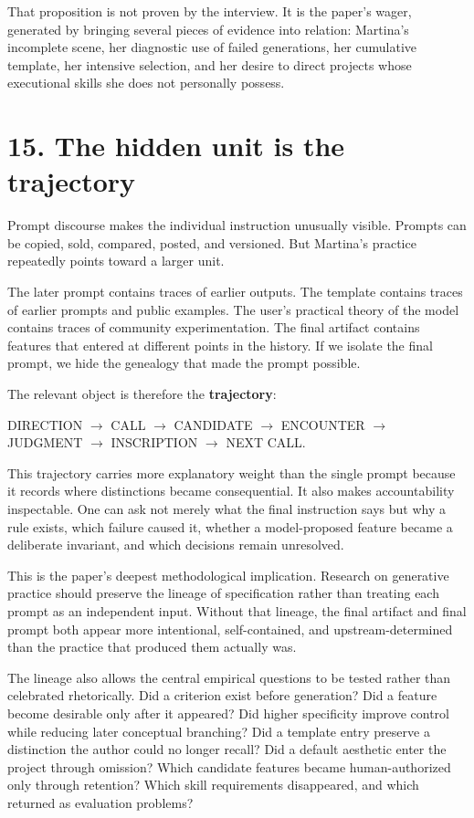\documentclass[
  11pt,
  letterpaper,
]{article}
\begin{document}
That proposition is not proven by the interview. It is the paper's
wager, generated by bringing several pieces of evidence into relation:
Martina's incomplete scene, her diagnostic use of failed generations,
her cumulative template, her intensive selection, and her desire to
direct projects whose executional skills she does not personally
possess.

\section{15. The hidden unit is the
trajectory}\label{the-hidden-unit-is-the-trajectory}

Prompt discourse makes the individual instruction unusually visible.
Prompts can be copied, sold, compared, posted, and versioned. But
Martina's practice repeatedly points toward a larger unit.

The later prompt contains traces of earlier outputs. The template
contains traces of earlier prompts and public examples. The user's
practical theory of the model contains traces of community
experimentation. The final artifact contains features that entered at
different points in the history. If we isolate the final prompt, we hide
the genealogy that made the prompt possible.

The relevant object is therefore the \textbf{trajectory}:

\begin{center}
DIRECTION $\rightarrow$ CALL $\rightarrow$ CANDIDATE $\rightarrow$ ENCOUNTER $\rightarrow$ JUDGMENT $\rightarrow$ INSCRIPTION $\rightarrow$ NEXT CALL.
\end{center}

This trajectory carries more explanatory weight than the single prompt
because it records where distinctions became consequential. It also
makes accountability inspectable. One can ask not merely what the final
instruction says but why a rule exists, which failure caused it, whether
a model-proposed feature became a deliberate invariant, and which
decisions remain unresolved.

This is the paper's deepest methodological implication. Research on
generative practice should preserve the lineage of specification rather
than treating each prompt as an independent input. Without that lineage,
the final artifact and final prompt both appear more intentional,
self-contained, and upstream-determined than the practice that produced
them actually was.

The lineage also allows the central empirical questions to be tested
rather than celebrated rhetorically. Did a criterion exist before
generation? Did a feature become desirable only after it appeared? Did
higher specificity improve control while reducing later conceptual
branching? Did a template entry preserve a distinction the author could
no longer recall? Did a default aesthetic enter the project through
omission? Which candidate features became human-authorized only through
retention? Which skill requirements disappeared, and which returned as
evaluation problems?
\end{document}
